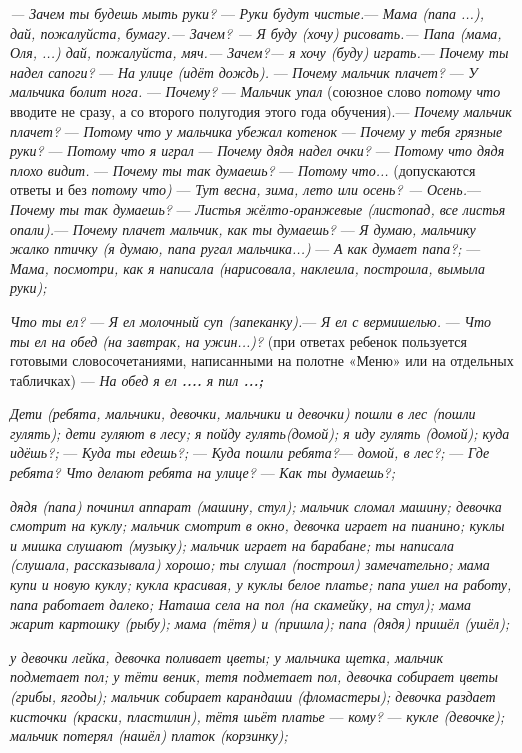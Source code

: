 \documentclass[a5paper]{book}
\renewcommand{\emph}[1]{\textit{#1}}
\begin{document}
\emph{--- Зачем ты будешь мыть руки?} --- \emph{Руки будут чистые.}---
\emph{Мама (папа ...), дай, пожалуйста, бумагу.--- Зачем? --- Я буду
(хочу) рисовать.--- Папа (мама, Оля, ...) дай, пожалуйста, мяч.---
Зачем?--- я хочу (буду) играть.}--- \emph{Почему ты надел сапоги?} ---
\emph{На улице (идёт дождь).} --- \emph{Почему мальчик плачет?} ---
\emph{У мальчика болит нога.} --- \emph{Почему?} --- \emph{Мальчик упал}
(союзное слово \emph{потому что} вводите не сразу, а со второго
полугодия этого года обучения).--- \emph{Почему мальчик плачет?} ---
\emph{Потому что у мальчика убежал котенок} --- \emph{Почему у тебя
грязные руки?} --- \emph{Потому что я играл} --- \emph{Почему дядя надел
очки?} --- \emph{Потому что дядя плохо видит.} --- \emph{Почему ты так
думаешь?} --- \emph{Потому что...} (допускаются ответы и без
\emph{потому что)} --- \emph{Тут весна, зима, лето или осень? ---
Осень.}--- \emph{Почему ты так думаешь?} --- \emph{Листья
жёлто-оранжевые (листопад, все листья опали).}--- \emph{Почему плачет
мальчик, как ты думаешь?} --- \emph{Я думаю, мальчику жалко птичку (я
думаю, папа ругал мальчика...)} --- \emph{А как думает папа?;} ---
\emph{Мама, посмотри, как я написала (нарисовала, наклеила, построила,
вымыла руки);}

\emph{Что ты ел?} --- \emph{Я ел молочный суп (запеканку).}--- \emph{Я
ел с вермишелью.} --- \emph{Что ты ел на обед (на завтрак, на ужин...)?}
(при ответах ребенок пользуется готовыми словосочетаниями, написанными
на полотне «Меню» или на отдельных табличках) --- \emph{На обед я ел
\textbf{....} я пил \textbf{...;}}

\emph{Дети (ребята, мальчики, девочки, мальчики и девочки) пошли в лес
(пошли гулять); дети гуляют в лесу; я пойду гулять(домой); я иду гулять
(домой); куда идёшь?;} --- \emph{Куда ты едешь?;} --- \emph{Куда пошли
ребята?}--- \emph{домой, в лес?;} --- \emph{Где ребята? Что делают
ребята на улице?} --- \emph{Как ты думаешь?;}

\emph{дядя (папа) починил аппарат (машину, стул); мальчик сломал машину;
девочка смотрит на куклу; мальчик смотрит в окно, девочка играет на
пианино; куклы и мишка слушают (музыку); мальчик играет на барабане; ты
написала (слушала, рассказывала) хорошо; ты слушал (построил)
замечательно; мама купи и новую куклу; кукла красивая, у куклы белое
платье; папа ушел на работу, папа работает далеко; Наташа села на пол
(на скамейку,} \emph{на стул); мама жарит картошку (рыбу); мама (тётя) и
(пришла); папа (дядя) пришёл (ушёл);}

\emph{у девочки лейка, девочка поливает цветы; у мальчика щетка, мальчик
подметает пол; у тёти веник, тетя подметает пол, девочка собирает цветы
(грибы, ягоды); мальчик собирает карандаши (фломастеры); девочка раздает
кисточки (краски, пластилин),} \emph{тётя шьёт платье} --- \emph{кому?}
--- \emph{кукле (девочке); мальчик потерял (нашёл) платок (корзинку);}
\end{document}
